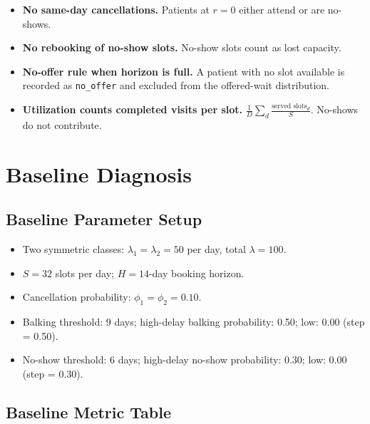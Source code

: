 \documentclass[11pt]{article}
\newcommand{\code}[1]{\texttt{#1}}
\begin{document}
\begin{itemize}[leftmargin=1.5em, itemsep=3pt]
    returned to the pool and can be rebooked.
  \item \textbf{No same-day cancellations.}  Patients at $r = 0$
    either attend or are no-shows.
  \item \textbf{No rebooking of no-show slots.}  No-show slots count
    as lost capacity.
  \item \textbf{No-offer rule when horizon is full.}  A patient with
    no slot available is recorded as \code{no\_offer} and excluded
    from the offered-wait distribution.
  \item \textbf{Utilization counts completed visits per slot.}
    $\frac{1}{D}\sum_d \frac{\text{served slots}_d}{S}$.
    No-shows do not contribute.
\end{itemize}

\section{Baseline Diagnosis}

\subsection{Baseline Parameter Setup}

\begin{itemize}[leftmargin=1.5em, itemsep=2pt]
  \item Two symmetric classes: $\lambda_1 = \lambda_2 = 50$ per day,
    total $\lambda = 100$.
  \item $S = 32$ slots per day; $H = 14$-day booking horizon.
  \item Cancellation probability: $\phi_1 = \phi_2 = 0.10$.
  \item Balking threshold: 9 days; high-delay balking probability:
    0.50; low: 0.00 (step = 0.50).
  \item No-show threshold: 6 days; high-delay no-show probability:
    0.30; low: 0.00 (step = 0.30).
\end{itemize}

\subsection{Baseline Metric Table}
\end{document}
